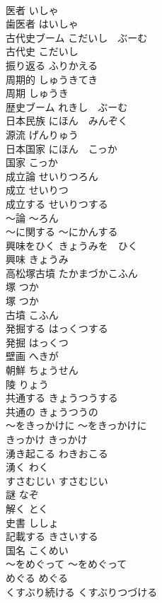 \documentclass[8pt]{extreport}
\begin{document}
\begin{CJK}{UTF8}{min}
\\	医者	いしゃ	
\\	歯医者	はいしゃ	
\\	古代史ブーム	こだいし　ぶーむ	
\\	古代史	こだいし	
\\	振り返る	ふりかえる	
\\	周期的	しゅうきてき	
\\	周期	しゅうき	
\\	歴史ブーム	れきし　ぶーむ	
\\	日本民族	にほん　みんぞく	
\\	源流	げんりゅう	
\\	日本国家	にほん　こっか	
\\	国家	こっか	
\\	成立論	せいりつろん	
\\	成立	せいりつ	
\\	成立する	せいりつする	
\\	〜論	〜ろん	
\\	〜に関する	〜にかんする	
\\	興味をひく	きょうみを　ひく	
\\	興味	きょうみ	
\\	高松塚古墳	たかまづかこふん	
\\	塚	つか	
\\	塚	つか	
\\	古墳	こふん	
\\	発掘する	はっくつする	
\\	発掘	はっくつ	
\\	壁画	へきが	
\\	朝鮮	ちょうせん	
\\	陵	りょう	
\\	共通する	きょうつうする	
\\	共通の	きょうつうの	
\\	〜をきっかけに	〜をきっかけに	
\\	きっかけ	きっかけ	
\\	湧き起こる	わきおこる	
\\	湧く	わく	
\\	すさむじい	すさむじい	
\\	謎	なぞ	
\\	解く	とく	
\\	史書	ししょ	
\\	記載する	きさいする	
\\	国名	こくめい	
\\	〜をめぐって	〜をめぐって	
\\	めぐる	めぐる	
\\	くすぶり続ける	くすぶりつづける	

\end{CJK}
\end{document}
